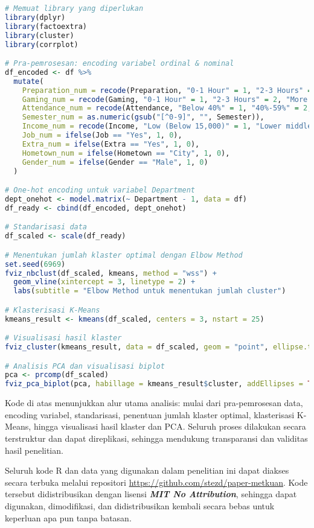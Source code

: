 \begin{lstlisting}[language=R, caption={Contoh implementasi analisis klasterisasi dan PCA di R}]
# Memuat library yang diperlukan
library(dplyr)
library(factoextra)
library(cluster)
library(corrplot)

# Pra-pemrosesan: encoding variabel ordinal & nominal
df_encoded <- df %>%
  mutate(
    Preparation_num = recode(Preparation, "0-1 Hour" = 1, "2-3 Hours" = 2, "More than 3 Hours" = 3),
    Gaming_num = recode(Gaming, "0-1 Hour" = 1, "2-3 Hours" = 2, "More than 3 Hours" = 3),
    Attendance_num = recode(Attendance, "Below 40%" = 1, "40%-59%" = 2, "60%-79%" = 3, "80%-100%" = 4),
    Semester_num = as.numeric(gsub("[^0-9]", "", Semester)),
    Income_num = recode(Income, "Low (Below 15,000)" = 1, "Lower middle (15,000-30,000)" = 2, "Upper middle (30,000-50,000)" = 3, "High (Above 50,000)" = 4),
    Job_num = ifelse(Job == "Yes", 1, 0),
    Extra_num = ifelse(Extra == "Yes", 1, 0),
    Hometown_num = ifelse(Hometown == "City", 1, 0),
    Gender_num = ifelse(Gender == "Male", 1, 0)
  )

# One-hot encoding untuk variabel Department
dept_onehot <- model.matrix(~ Department - 1, data = df)
df_ready <- cbind(df_encoded, dept_onehot)

# Standarisasi data
df_scaled <- scale(df_ready)

# Menentukan jumlah klaster optimal dengan Elbow Method
set.seed(6969)
fviz_nbclust(df_scaled, kmeans, method = "wss") +
  geom_vline(xintercept = 3, linetype = 2) +
  labs(subtitle = "Elbow Method untuk menentukan jumlah cluster")

# Klasterisasi K-Means
kmeans_result <- kmeans(df_scaled, centers = 3, nstart = 25)

# Visualisasi hasil klaster
fviz_cluster(kmeans_result, data = df_scaled, geom = "point", ellipse.type = "convex", palette = "jco", ggtheme = theme_minimal())

# Analisis PCA dan visualisasi biplot
pca <- prcomp(df_scaled)
fviz_pca_biplot(pca, habillage = kmeans_result$cluster, addEllipses = TRUE, palette = "jco", ggtheme = theme_minimal())
\end{lstlisting}

Kode di atas menunjukkan alur utama analisis: mulai dari pra-pemrosesan data, encoding variabel, standarisasi, penentuan jumlah klaster optimal, klasterisasi K-Means, hingga visualisasi hasil klaster dan PCA. Seluruh proses dilakukan secara terstruktur dan dapat direplikasi, sehingga mendukung transparansi dan validitas hasil penelitian.

Seluruh kode R dan data yang digunakan dalam penelitian ini dapat diakses secara terbuka melalui repositori \url{https://github.com/stezd/paper-metkuan}. Kode tersebut didistribusikan dengan lisensi \textbf{\textit{MIT No Attribution}}, sehingga dapat digunakan, dimodifikasi, dan didistribusikan kembali secara bebas untuk keperluan apa pun tanpa batasan.
